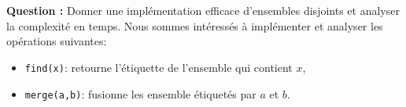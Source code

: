 \documentclass[11pt]{article} %
\newenvironment{question}[1][\unskip]{%
	\par
	\noindent
	\textbf{Question #1:}
	\noindent}
{\medskip}
\begin{document}
	\section{}
	
	\begin{question}
		Donner une implémentation efficace d'ensembles disjoints et analyser la complexité en temps.	Nous sommes intéressés à implémenter et analyser les opérations suivantes:
		\begin{itemize}
			\item {\verb|find(x)|: retourne l'étiquette de l'ensemble qui contient $x$,}
			\item{\verb|merge(a,b)|: fusionne les ensemble étiquetés par $a$ et $b$.}
		\end{itemize}
	\end{question}
	
\end{document}
